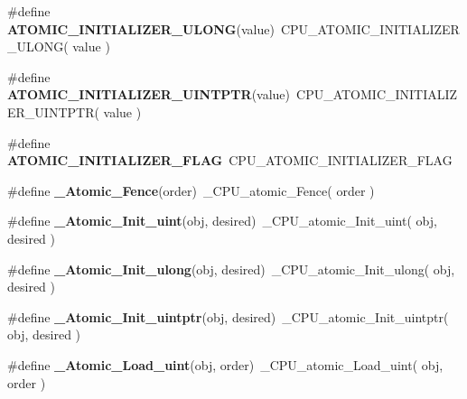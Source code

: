 \begin{DoxyCompactItemize}
\#define {\bfseries A\+T\+O\+M\+I\+C\+\_\+\+I\+N\+I\+T\+I\+A\+L\+I\+Z\+E\+R\+\_\+\+U\+L\+O\+NG}(value)~C\+P\+U\+\_\+\+A\+T\+O\+M\+I\+C\+\_\+\+I\+N\+I\+T\+I\+A\+L\+I\+Z\+E\+R\+\_\+\+U\+L\+O\+NG( value )
\item 
\mbox{\label{group__RTEMSScoreAtomic_gafdc9bd681ea02b7b5542e5ff37403380}} 
\#define {\bfseries A\+T\+O\+M\+I\+C\+\_\+\+I\+N\+I\+T\+I\+A\+L\+I\+Z\+E\+R\+\_\+\+U\+I\+N\+T\+P\+TR}(value)~C\+P\+U\+\_\+\+A\+T\+O\+M\+I\+C\+\_\+\+I\+N\+I\+T\+I\+A\+L\+I\+Z\+E\+R\+\_\+\+U\+I\+N\+T\+P\+TR( value )
\item 
\mbox{\label{group__RTEMSScoreAtomic_gadf7b6d0ed9b353081292a8ec1c550701}} 
\#define {\bfseries A\+T\+O\+M\+I\+C\+\_\+\+I\+N\+I\+T\+I\+A\+L\+I\+Z\+E\+R\+\_\+\+F\+L\+AG}~C\+P\+U\+\_\+\+A\+T\+O\+M\+I\+C\+\_\+\+I\+N\+I\+T\+I\+A\+L\+I\+Z\+E\+R\+\_\+\+F\+L\+AG
\item 
\mbox{\label{group__RTEMSScoreAtomic_gaa4fb952d5aed9d2e30458ae37e09215d}} 
\#define {\bfseries \+\_\+\+Atomic\+\_\+\+Fence}(order)~\+\_\+\+C\+P\+U\+\_\+atomic\+\_\+\+Fence( order )
\item 
\mbox{\label{group__RTEMSScoreAtomic_ga4f0a9875b31e881693edd2bd2bdb4ace}} 
\#define {\bfseries \+\_\+\+Atomic\+\_\+\+Init\+\_\+uint}(obj,  desired)~\+\_\+\+C\+P\+U\+\_\+atomic\+\_\+\+Init\+\_\+uint( obj, desired )
\item 
\mbox{\label{group__RTEMSScoreAtomic_gae6895a8227e1c79874ae37ae343aad13}} 
\#define {\bfseries \+\_\+\+Atomic\+\_\+\+Init\+\_\+ulong}(obj,  desired)~\+\_\+\+C\+P\+U\+\_\+atomic\+\_\+\+Init\+\_\+ulong( obj, desired )
\item 
\mbox{\label{group__RTEMSScoreAtomic_gae5b7efc0cdfcbbcf289c42c0046529e6}} 
\#define {\bfseries \+\_\+\+Atomic\+\_\+\+Init\+\_\+uintptr}(obj,  desired)~\+\_\+\+C\+P\+U\+\_\+atomic\+\_\+\+Init\+\_\+uintptr( obj, desired )
\item 
\mbox{\label{group__RTEMSScoreAtomic_gaba2d3d587de4fd25f209bf53751c740b}} 
\#define {\bfseries \+\_\+\+Atomic\+\_\+\+Load\+\_\+uint}(obj,  order)~\+\_\+\+C\+P\+U\+\_\+atomic\+\_\+\+Load\+\_\+uint( obj, order )

\end{DoxyCompactItemize}
